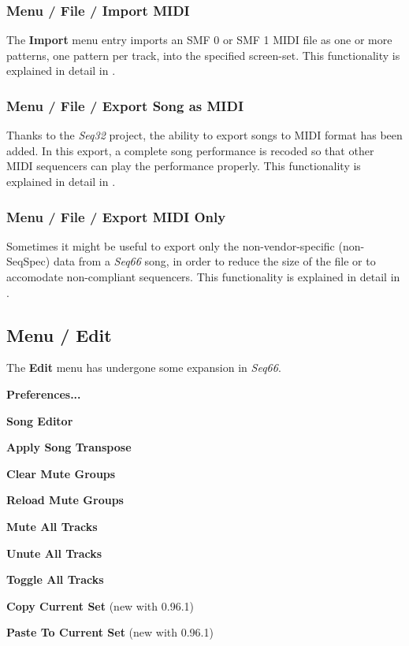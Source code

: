 \subsubsection{Menu / File / Import MIDI}
\label{subsubsec:menu_file_import}

   The \textbf{Import} menu entry imports an SMF 0
   or SMF 1 MIDI file as one or more patterns, one pattern per track,
   into the specified screen-set.
   This functionality is explained in detail in
   .

\subsubsection{Menu / File / Export Song as MIDI}
\label{subsubsec:menu_file_export}

   Thanks to the \textsl{Seq32} project, the ability to export songs to MIDI
   format has been added.  In this export, a complete song performance is
   recoded so that other MIDI sequencers can play the performance properly.
   This functionality is explained in detail in
   .

\subsubsection{Menu / File / Export MIDI Only}
\label{subsubsec:menu_file_export_midi_only}

   Sometimes it might be useful to export only the non-vendor-specific
   (non-SeqSpec) data from a \textsl{Seq66} song, in order to reduce the
   size of the file or to accomodate non-compliant sequencers.
   This functionality is explained in detail in
   .

\subsection{Menu / Edit}
\label{subsec:menu_edit}

   The \textbf{Edit} menu has undergone some expansion in \textsl{Seq66}.

   \begin{enumber}
      \item \textbf{Preferences...}
      \item \textbf{Song Editor}
      \item \textbf{Apply Song Transpose}
      \item \textbf{Clear Mute Groups}
      \item \textbf{Reload Mute Groups}
      \item \textbf{Mute All Tracks}
      \item \textbf{Unute All Tracks}
      \item \textbf{Toggle All Tracks}
      \item \textbf{Copy Current Set} (new with 0.96.1)
      \item \textbf{Paste To Current Set} (new with 0.96.1)
   \end{enumber}

